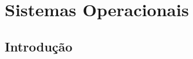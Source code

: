 













\hypertarget{sistemas-operacionais}{%
\chapter{Sistemas Operacionais}\label{sistemas-operacionais}}



\hypertarget{Introdução}{%
\section{Introdução}\label{Introdução}}

